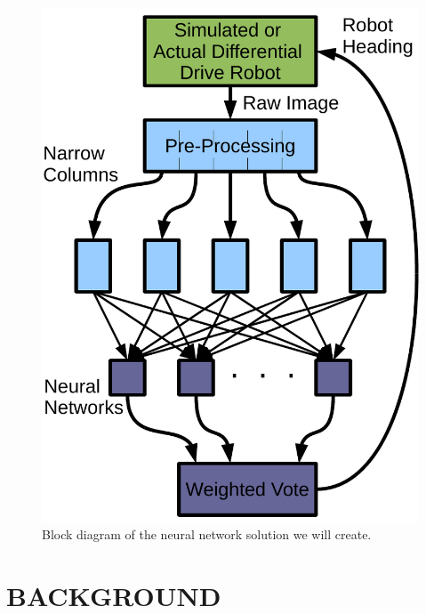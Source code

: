 \documentclass[letterpaper, 10 pt, conference]{ieeeconf}
\begin{document}
		\begin{figure}
			\begin{center}
				\includegraphics[width=\columnwidth]{block_diagram.pdf}
			\end{center}
			\caption{Block diagram of the neural network solution we will create.}
			\label{block_diagram}
		\end{figure}

	\section*{BACKGROUND}
\end{document}
